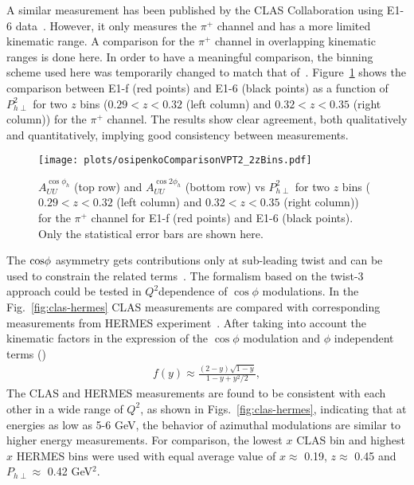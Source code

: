\documentclass[aps,prl,twocolumn,showpacs,superscriptaddress,groupedaddress]{revtex4}  %
\newcommand{\Phperp}{P_{h\perp}}
\newcommand{\xbj}{x}
\begin{document}
A similar measurement has been published by the CLAS Collaboration using \mbox{E1-6} data~\cite{Osipenko:2008rv}.
However, it only measures the $\pi^+$ channel and has a more limited kinematic range.
A comparison for the $\pi^+$ channel in overlapping kinematic ranges is done here.
In order to have a meaningful comparison, the binning scheme used here was temporarily changed to match that of~\cite{Osipenko:2008rv}.
Figure~\ref{fig:osipenkoComparisonVPT2_2zBins} shows the comparison between E1-f (red points) and E1-6 (black points) as a function of $\Phperp^2$ for two $z$ bins ($0.29 < z < 0.32$ (left column) and $0.32 < z < 0.35$ (right column)) for the $\pi^+$ channel.
The results show clear agreement, both qualitatively and quantitatively, implying good consistency between measurements.
%
\begin{figure}[htp]
\centering
\texttt{[image: plots/osipenkoComparisonVPT2\_2zBins.pdf]}
\caption{$A_{UU}^{\cos \phi_h}$ (top row) and $A_{UU}^{\cos 2\phi_h}$ (bottom row) vs $P_{h\perp}^2$ for two $z$ bins ($0.29 < z < 0.32$ (left column) and $0.32 < z < 0.35$ (right column)) for the $\pi^+$ channel for E1-f (red points) and E1-6 (black points). Only the statistical error bars are shown here.}
\label{fig:osipenkoComparisonVPT2_2zBins}
\end{figure}


The $\rm cos \phi$ asymmetry gets contributions only at sub-leading twist and can be used to constrain the related terms~\cite{Cahn:1978se,Anselmino:2005nn,Berger:1979xz}.
The formalism based on the twist-3 approach could be tested in $Q^2$dependence of $\cos\phi$ modulations.  In the Fig.~\ref{fig:clas-hermes}  CLAS measurements are compared with corresponding measurements from HERMES experiment~\cite{Airapetian:2012yg}.
After taking into account the kinematic factors in the expression
of the $\cos\phi$ modulation and $\phi$ independent terms (\cite{Bacchetta:2006tn})
\begin{eqnarray}
f(y)\approx \frac{(2-y)\sqrt{1-y}}{1-y+y^{2}/2} ,
\label{fy}
\end{eqnarray}
The CLAS and HERMES measurements are found to 
be consistent with each other in a wide range of $Q^2$, as shown in Figs.~\ref{fig:clas-hermes}, indicating that at energies as low as 5-6 GeV, the
behavior of azimuthal modulations are similar to higher energy measurements. 
For comparison, the lowest $\xbj$ CLAS bin and highest $\xbj$ HERMES bins were used with equal average value of $\xbj\approx$ 0.19, $z\approx$ 0.45 and $\Phperp\approx$ 0.42 GeV$^2$.
\end{document}
